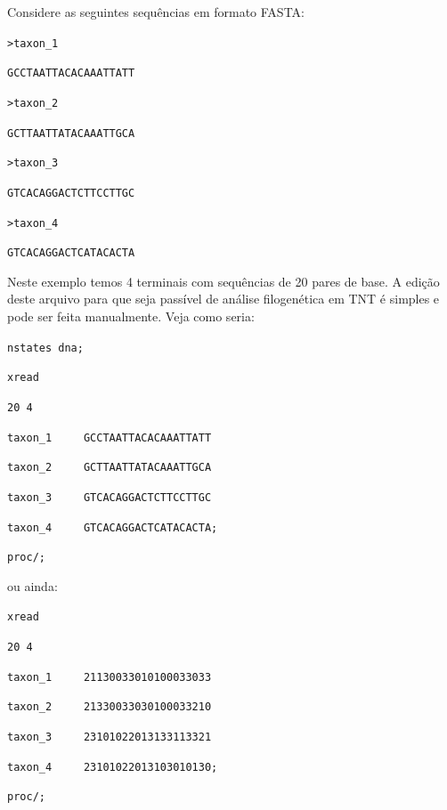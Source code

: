 \begin{refsection}
	Considere as seguintes sequências em formato FASTA:\\

\scriptsize

\noindent\texttt{>taxon\_1}

\noindent\texttt{GCCTAATTACACAAATTATT}

\noindent\texttt{>taxon\_2}

\noindent\texttt{GCTTAATTATACAAATTGCA}

\noindent\texttt{>taxon\_3}

\noindent\texttt{GTCACAGGACTCTTCCTTGC}

\noindent\texttt{>taxon\_4}

\noindent\texttt{GTCACAGGACTCATACACTA}


\normalsize

Neste exemplo temos 4 terminais com sequências de 20 pares de base. A edição deste arquivo para que seja passível de análise filogenética em TNT é simples e pode ser feita manualmente. Veja como seria:\\


\scriptsize

\noindent\texttt{nstates dna;}

\noindent\texttt{xread}

\noindent\texttt{20 4}


\noindent\texttt{taxon\_1~~~~~GCCTAATTACACAAATTATT}


\noindent\texttt{taxon\_2~~~~~GCTTAATTATACAAATTGCA}


\noindent\texttt{taxon\_3~~~~~GTCACAGGACTCTTCCTTGC}


\noindent\texttt{taxon\_4~~~~~GTCACAGGACTCATACACTA;}

\noindent\texttt{proc/;}


\normalsize

ou ainda:\\

\scriptsize

\noindent\texttt{xread}

\noindent\texttt{20 4}


\noindent\texttt{taxon\_1~~~~~21130033010100033033}


\noindent\texttt{taxon\_2~~~~~21330033030100033210}


\noindent\texttt{taxon\_3~~~~~23101022013133113321}


\noindent\texttt{taxon\_4~~~~~23101022013103010130;}

\noindent\texttt{proc/;}\\



\end{refsection}
